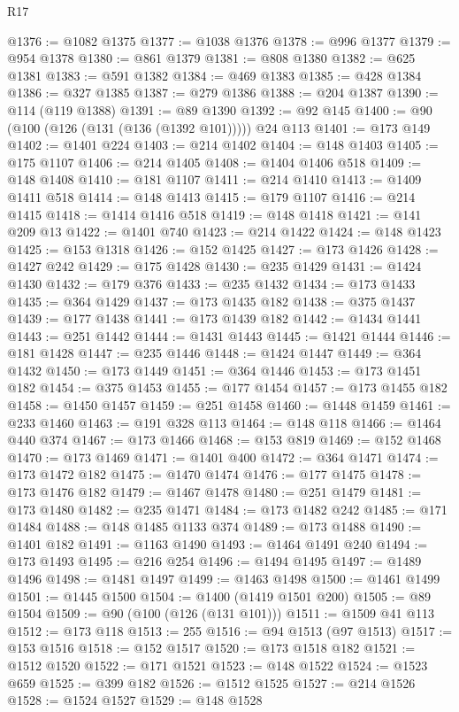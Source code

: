 \begin{lexlean}{R17}
\begin{coremodule}
@1376 := @1082 @1375
@1377 := @1038 @1376
@1378 := @996 @1377
@1379 := @954 @1378
@1380 := @861 @1379
@1381 := @808 @1380
@1382 := @625 @1381
@1383 := @591 @1382
@1384 := @469 @1383
@1385 := @428 @1384
@1386 := @327 @1385
@1387 := @279 @1386
@1388 := @204 @1387
@1390 := @114 (@119 @1388)
@1391 := @89 @1390
@1392 := @92 @145
@1400 := @90 (@100 (@126 (@131 (@136 (@1392 @101))))) @24 @113
@1401 := @173 @149
@1402 := @1401 @224
@1403 := @214 @1402
@1404 := @148 @1403
@1405 := @175 @1107
@1406 := @214 @1405
@1408 := @1404 @1406 @518
@1409 := @148 @1408
@1410 := @181 @1107
@1411 := @214 @1410
@1413 := @1409 @1411 @518
@1414 := @148 @1413
@1415 := @179 @1107
@1416 := @214 @1415
@1418 := @1414 @1416 @518
@1419 := @148 @1418
@1421 := @141 @209 @13
@1422 := @1401 @740
@1423 := @214 @1422
@1424 := @148 @1423
@1425 := @153 @1318
@1426 := @152 @1425
@1427 := @173 @1426
@1428 := @1427 @242
@1429 := @175 @1428
@1430 := @235 @1429
@1431 := @1424 @1430
@1432 := @179 @376
@1433 := @235 @1432
@1434 := @173 @1433
@1435 := @364 @1429
@1437 := @173 @1435 @182
@1438 := @375 @1437
@1439 := @177 @1438
@1441 := @173 @1439 @182
@1442 := @1434 @1441
@1443 := @251 @1442
@1444 := @1431 @1443
@1445 := @1421 @1444
@1446 := @181 @1428
@1447 := @235 @1446
@1448 := @1424 @1447
@1449 := @364 @1432
@1450 := @173 @1449
@1451 := @364 @1446
@1453 := @173 @1451 @182
@1454 := @375 @1453
@1455 := @177 @1454
@1457 := @173 @1455 @182
@1458 := @1450 @1457
@1459 := @251 @1458
@1460 := @1448 @1459
@1461 := @233 @1460
@1463 := @191 @328 @113
@1464 := @148 @118
@1466 := @1464 @440 @374
@1467 := @173 @1466
@1468 := @153 @819
@1469 := @152 @1468
@1470 := @173 @1469
@1471 := @1401 @400
@1472 := @364 @1471
@1474 := @173 @1472 @182
@1475 := @1470 @1474
@1476 := @177 @1475
@1478 := @173 @1476 @182
@1479 := @1467 @1478
@1480 := @251 @1479
@1481 := @173 @1480
@1482 := @235 @1471
@1484 := @173 @1482 @242
@1485 := @171 @1484
@1488 := @148 @1485 @1133 @374
@1489 := @173 @1488
@1490 := @1401 @182
@1491 := @1163 @1490
@1493 := @1464 @1491 @240
@1494 := @173 @1493
@1495 := @216 @254
@1496 := @1494 @1495
@1497 := @1489 @1496
@1498 := @1481 @1497
@1499 := @1463 @1498
@1500 := @1461 @1499
@1501 := @1445 @1500
@1504 := @1400 (@1419 @1501 @200)
@1505 := @89 @1504
@1509 := @90 (@100 (@126 (@131 @101)))
@1511 := @1509 @41 @113
@1512 := @173 @118
@1513 := 255
@1516 := @94 @1513 (@97 @1513)
@1517 := @153 @1516
@1518 := @152 @1517
@1520 := @173 @1518 @182
@1521 := @1512 @1520
@1522 := @171 @1521
@1523 := @148 @1522
@1524 := @1523 @659
@1525 := @399 @182
@1526 := @1512 @1525
@1527 := @214 @1526
@1528 := @1524 @1527
@1529 := @148 @1528

\end{coremodule}
\end{lexlean}
